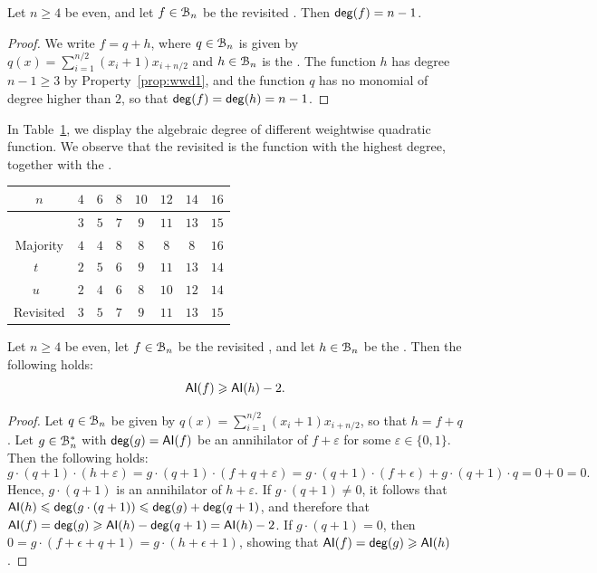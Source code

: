 \documentclass[11pt]{llncs}
\begin{document}
\begin{proposition}
	Let $n\geq 4$ be even, and let $f\in\mathcal{B}_n$ be the revisited \hwbf{}. Then $\mathsf{deg}(f)=n-1$.
\end{proposition}
\begin{proof}
	We write $f=q+h$, where $q\in\mathcal{B}_n$ is given by $q(x)=\sum_{i=1}^{n/2} (x_i+1) x_{i+n/2}$ and $h\in\mathcal{B}_n$ is the \hwbf{}.
	The function $h$ has degree $n-1\geq 3$ by Property~\ref{prop:wwd1}, and the function $q$ has no monomial of degree higher than $2$, so that $\mathsf{deg}(f)=\mathsf{deg}(h)=n-1$.
\end{proof}

In Table~\ref{table:comparisonsDeg}, we display the algebraic degree of different weightwise quadratic function. We observe that the revisited \hwbf{} is the function with the highest degree, together with the \hwbf{}. 

\begin{table}[ht]
	\small
	\centering
	\begin{tabular}{|c|c|c|c|c|c|c|c|}
		\hline
		$n$ & $4$  & $6$  & $8$  &  $10$ & $12$ & $14$ & $16$  \\
		\hline
		\hwbf{}   & $3$  & $5$  & $7$  &  $9$ & $11$ & $13$ & $15$  \\  	
		Majority   & $4$  & $4$  & $8$  &  $8$ & $8$ & $8$ & $16$  \\
		$t$~\cite{DAM:MeaOza24}   & $2$  & $5$  & $6$  &  $9$ & $11$ & $13$ & $14$\\
		$u$~\cite{DAM:MeaOza24}   & $2$  & $4$  & $6$  &  $8$ & $10$ & $12$ & $14$ \\
		Revisited \hwbf{}  & $3$  & $5$  & $7$  &  $9$ & $11$ & $13$ & $15$\\
		\hline
	\end{tabular}
	\label{table:comparisonsDeg}
\end{table}

\begin{proposition}
	Let $n\geq 4$ be even, let $f\in\mathcal{B}_n$ be the revisited \hwbf{}, and let $h\in\mathcal{B}_n$ be the \hwbf{}. Then the following holds:
	\[\mathsf{AI}(f)\geqslant \mathsf{AI}(h)-2.\]
\end{proposition}

\begin{proof}
	Let $q\in\mathcal{B}_n$ be given by $q(x)=\sum_{i=1}^{n/2} (x_i+1) x_{i+n/2}$, so that $h=f+q$.
	Let $g\in\mathcal{B}_n^*$ with $\mathsf{deg}(g)=\mathsf{AI}(f)$ be an annihilator of $f+ \varepsilon$ for some $\varepsilon\in\{0,1\}$. 
	Then the following holds:
	\[g\cdot(q+1) \cdot(h+\varepsilon) = g\cdot(q+1)\cdot(f+q+\varepsilon)=g\cdot(q+1)\cdot(f+\epsilon)+g\cdot(q+1)\cdot q=0+0=0.\]
	Hence, $g\cdot(q+1)$ is an annihilator of $h+ \varepsilon$. 
	If $g\cdot(q+1)\ne 0$, it follows that $\mathsf{AI}(h)\leqslant\mathsf{deg}(g\cdot(q+1))\leqslant\mathsf{deg}(g)+\mathsf{deg}(q+1)$, and therefore that $\mathsf{AI}(f)=\mathsf{deg}(g)\geqslant\mathsf{AI}(h)-\mathsf{deg}(q+1)=\mathsf{AI}(h)-2$. If $g\cdot(q+1)=0$, then $0=g\cdot(f+\epsilon+q+1)=g\cdot(h+\epsilon+1)$, showing that $\mathsf{AI}(f)=\mathsf{deg}(g)\geqslant\mathsf{AI}(h)$.
\end{proof}
\end{document}
